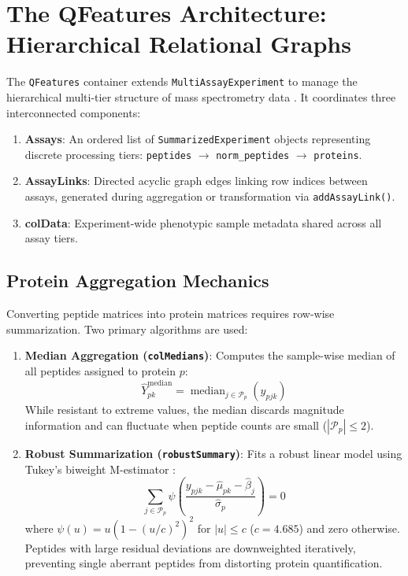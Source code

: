 \documentclass[11pt,twoside,openright]{book}
\begin{document}
\FloatBarrier
\section{The QFeatures Architecture: Hierarchical Relational Graphs}
\label{sec:qfeatures_arch}

The \texttt{QFeatures} container extends \texttt{MultiAssayExperiment} to manage the hierarchical multi-tier structure of mass spectrometry data \cite{gatto2023qfeatures, vanderaa2021scp, huber2015orchestrating}. It coordinates three interconnected components:
\begin{enumerate}
\item \textbf{Assays}: An ordered list of \texttt{SummarizedExperiment} objects representing discrete processing tiers: \texttt{peptides} $\to$ \texttt{norm\_peptides} $\to$ \texttt{proteins}.
\item \textbf{AssayLinks}: Directed acyclic graph edges linking row indices between assays, generated during aggregation or transformation via \texttt{addAssayLink()}.
\item \textbf{colData}: Experiment-wide phenotypic sample metadata shared across all assay tiers.
\end{enumerate}

\subsection{Protein Aggregation Mechanics}

Converting peptide matrices into protein matrices requires row-wise summarization. Two primary algorithms are used:
\begin{enumerate}
\item \textbf{Median Aggregation (\texttt{colMedians})}: Computes the sample-wise median of all peptides assigned to protein $p$:
\begin{equation}
\hat{Y}_{pk}^{\text{median}} = \operatorname{median}_{j \in \mathcal{P}_p} (y_{pjk})
\label{eq:col_medians}
\end{equation}
While resistant to extreme values, the median discards magnitude information and can fluctuate when peptide counts are small ($|\mathcal{P}_p| \le 2$).
\item \textbf{Robust Summarization (\texttt{robustSummary})}: Fits a robust linear model using Tukey's biweight M-estimator \cite{stucki2022mscoreutils, ting2011msstats}:
\begin{equation}
\sum_{j \in \mathcal{P}_p} \psi\left( \frac{y_{pjk} - \hat{\mu}_{pk} - \hat{\beta}_j}{\hat{\sigma}_p} \right) = 0
\label{eq:robust_summary}
\end{equation}
where $\psi(u) = u(1 - (u/c)^2)^2$ for $|u| \le c$ ($c = 4.685$) and zero otherwise. Peptides with large residual deviations are downweighted iteratively, preventing single aberrant peptides from distorting protein quantification.
\end{enumerate}
\end{document}
